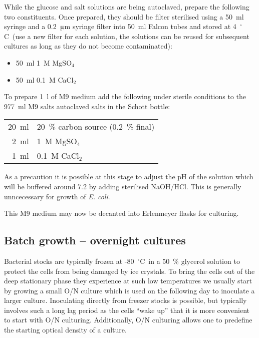 \documentclass[a4paper]{article}
\newcommand{\dc}{~$^{\circ}$C}
\newcommand{\ec}{\textit{E. coli}}
\newcommand{\micro}{$\muup$}
\begin{document}
\begin{multicols}{2}
While the glucose and salt solutions are being autoclaved, prepare the
following two constituents. Once prepared, they should be filter sterilised
using a 50~ml syringe and a 0.2~\micro m syringe filter into 50~ml
Falcon tubes and stored at 4\dc\ (use a new filter for each solution, the
solutions can be reused for subsequent cultures as long as they do not become
contaminated):

\begin{itemize}
\item 50~ml 1~M MgSO$_4$
\item 50~ml 0.1~M CaCl$_2$
\end{itemize}

To prepare 1~l of M9 medium add the following under sterile conditions to the
977~ml M9 salts autoclaved salts in the Schott bottle:

\begin{center}
\begin{tabular}[h]{rl} \toprule
20~ml   & 20~\% carbon source (0.2~\% final)\\
2~ml    & 1~M MgSO$_4$\\
1~ml    & 0.1~M CaCl$_2$\\ \bottomrule
\end{tabular}
\end{center}

As a precaution it is possible at this stage to adjust the pH of the solution
which will be buffered around 7.2 by adding sterilised NaOH/HCl. This is
generally unncecessary for growth of \ec.

This M9 medium may now be decanted into Erlenmeyer flasks for culturing.


\subsection{Batch growth -- overnight cultures} 

Bacterial stocks are typically frozen at -80\dc\ in a 50~\% glycerol solution
to protect the cells from being damaged by ice crystals. To bring the cells out
of the deep stationary phase they experience at such low temperatures we
usually start by growing a small O/N culture which is used on the following day
to inoculate a larger culture. Inoculating directly from freezer stocks is
possible, but typically involves such a long lag period as the cells ``wake
up'' that it is more convenient to start with O/N culturing. Additionally, O/N
culturing allows one to predefine the starting optical density of a culture.


\end{multicols}
\end{document}
